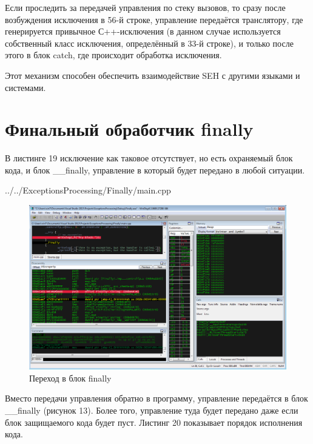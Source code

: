 \documentclass[a4paper, 12pt]{report}		%
\begin{document}


Если проследить за передачей управления по стеку вызовов, то сразу после возбуждения исключения в 56-й строке, управление передаётся транслятору, где генерируется привычное С++-исключения (в данном случае используется собственный класс исключения, определённый в 33-й строке), и только после этого в блок catch, где происходит обработка исключения.

Этот механизм способен обеспечить взаимодействие SEH с другими языками и системами.

\chapter*{Финальный обработчик finally}

В листинге 19 исключение как таковое отсутствует, но есть охраняемый блок кода, и блок \_\_finally, управление в который будет передано в любой ситуации.


{../../ExceptionsProcessing/Finally/main.cpp}

\begin{figure}[h!]
\centering
\includegraphics[scale=0.50]{res/013}
\caption{Переход в блок finally}
\end{figure}



Вместо передачи управления обратно в программу, управление передаётся в блок \_\_finally (рисунок 13). Более того, управление туда будет передано даже если блок защищаемого кода будет пуст. Листинг 20 показывает порядок исполнения кода.
\end{document}

